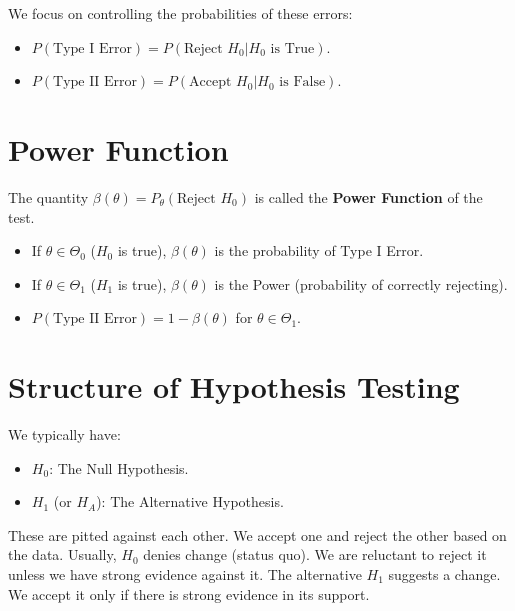 \documentclass[12pt, a4paper]{article}
\theoremstyle{definition}
\begin{document}
We focus on controlling the probabilities of these errors:
\begin{itemize}
    \item $P(\text{Type I Error}) = P(\text{Reject } H_0 | H_0 \text{ is True})$.
    \item $P(\text{Type II Error}) = P(\text{Accept } H_0 | H_0 \text{ is False})$.
\end{itemize}

\section{Power Function}

The quantity $\beta(\theta) = P_\theta(\text{Reject } H_0)$ is called the \textbf{Power Function} of the test.

\begin{itemize}
    \item If $\theta \in \Theta_0$ ($H_0$ is true), $\beta(\theta)$ is the probability of Type I Error.
    \item If $\theta \in \Theta_1$ ($H_1$ is true), $\beta(\theta)$ is the Power (probability of correctly rejecting).
    \item $P(\text{Type II Error}) = 1 - \beta(\theta)$ for $\theta \in \Theta_1$.
\end{itemize}

\section{Structure of Hypothesis Testing}

We typically have:
\begin{itemize}
    \item $H_0$: The Null Hypothesis.
    \item $H_1$ (or $H_A$): The Alternative Hypothesis.
\end{itemize}
These are pitted against each other. We accept one and reject the other based on the data.
Usually, $H_0$ denies change (status quo). We are reluctant to reject it unless we have strong evidence against it.
The alternative $H_1$ suggests a change. We accept it only if there is strong evidence in its support.
\end{document}

